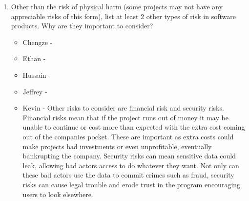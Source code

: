 \documentclass{article}
\begin{document}
\begin{enumerate}
\begin{itemize}
    \end{itemize} 
    \item Other than the risk of physical harm (some projects may not have any
    appreciable risks of this form), list at least 2 other types of risk in
    software products. Why are they important to consider?
    \begin{itemize}
        \item Chengze - 
        \item Ethan - 
        \item Hussain - 
        \item Jeffrey - 
        \item Kevin - Other risks to consider are financial risk and security risks. Financial risks mean that if the project runs out of money it may be unable to continue or cost more than expected with the extra cost coming out of the companies pocket. These are important as extra costs could make projects bad investments or even unprofitable, eventually bankrupting the company. Security risks can mean sensitive data could leak, allowing bad actors access to do whatever they want. Not only can these bad actors use the data to commit crimes such as fraud, security risks can cause legal trouble and erode trust in the program encouraging users to look elsewhere. 
    \end{itemize} 
\end{enumerate}
\end{document}

